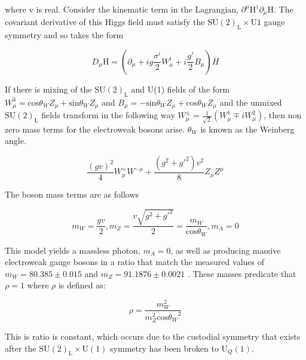 where v is real.  Consider the kinematic term in the Lagrangian, $\partial^{\mu} \text{H}^{\dagger} \partial_{\mu} \text{H}$.  The covariant derivative of this Higgs field must satisfy the $\text{SU}(2)_{\text{L}} \times \text{U}1$ gauge symmetry and so takes the form

\begin{equation}
D_{\mu} \text{H} = (\partial_{\mu} + ig\frac{\sigma^{i}}{2}W^{i}_{\mu} + i\frac{g'}{2}B_{\mu})H
\end{equation}

If there is mixing of the $\text{SU}(2)_{\text{L}}$ and U(1) fields of the form $W^{3}_{\mu} = \text{cos}{\theta_{W}}Z_{\mu} + \text{sin}{\theta_{W}}Z_{\mu}$ and $B_{\mu} = -\text{sin}{\theta_{W}}Z_{\mu} + \text{cos}{\theta_{W}}Z_{\mu}$ and the unmixed $\text{SU}(2)_{\text{L}}$ fields transform in the following way $W^{\pm}_{\mu} = \frac{1}{\sqrt{2}}(W^{1}_{\mu} \mp i W^{2}_{\mu})$, then non zero mass terms for the electroweak bosons arise.  $\theta_{W}$ is known as the Weinberg angle.

\begin{equation}
\frac{(gv)^{2}}{4} W^{+}_{\mu} W^{-\mu} + \frac{(g^{2} + g'^{2})v^{2}}{8} Z_{\mu} Z^{\mu}
\end{equation}

The boson mass terms are as follows

\begin{equation}
m_{W} = \frac{gv}{2}, m_{Z} = \frac{v\sqrt{g^{2} + g'^{2}}}{2} = \frac{m_{W}}{\text{cos}{\theta_{W}}}, m_{A} = 0
\end{equation}

This model yields a massless photon, $m_{A} = 0$, as well as producing massive electroweak gauge bosons in a ratio that match the measured values of $m_{W} = 80.385 \pm 0.015$ and $m_{Z} = 91.1876 \pm 0.0021$ \cite{Beringer:1900zz}.  These masses predicate that $\rho = 1$ where $\rho$ is defined as:

\begin{equation}
\rho = \frac{m_{W}^{2}}{m_{Z}^{2}\text{cos}{\theta_{W}}^{2}}
\end{equation}

This is ratio is constant, which occurs due to the custodial symmetry that exists after the $\text{SU}(2)_{\text{L}} \times \text{U}(1)$ symmetry has been broken to $\text{U}_{Q}(1)$.


